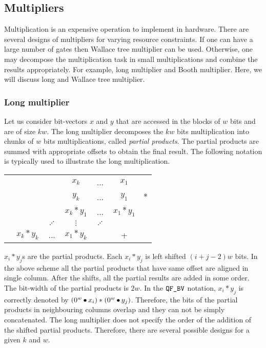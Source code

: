 \subsection{Multipliers}

Multiplication is an expensive operation to implement in hardware.
%
There are several designs of multipliers for varying
resource constraints.
%
If one can have a large number of gates then Wallace tree
multiplier can be used.
%
Otherwise, one may decompose the multiplication task in
small multiplications and combine the results appropriately.
%
For example, long multiplier and Booth multiplier.
%
Here, we will discuss long and Wallace tree multiplier.

\subsubsection{Long multiplier}\label{sec:long-mult}

Let us consider bit-vectors $x$ and $y$ that are accessed in the blocks of $w$
bits and are of size $kw$.
%
The long multiplier decomposes the $kw$ bits multiplication 
into chunks of $w$ bits multiplications, called {\em partial products}.
%
The partial products are summed with appropriate offsets to obtain
the final result.
%
The following notation is typically used to illustrate
the long multiplication.
%
\begin{center}
\begin{tabular}{c@{\quad}c@{\quad}c@{\quad}c@{\quad}c@{\quad}c@{\quad}c}
  &&& $x_{k}$ & ... & $x_1$&\\ 
  &&& $y_{k}$ & ... & $y_1$&$*$\\ \hline
  &&&$x_k*y_1$& ... & $x_1*y_1$&\\
  &&$\iddots$&$\vdots$& $\iddots$ && \\
  &$x_k*y_k$& ... &$x_1*y_k$&  & +&\\\hline
\end{tabular}  
\end{center}
$x_i * y_j$s are the partial products.
%
Each $x_i*y_j$ is left shifted $(i+j-2)w$ bits. 
%
In the above scheme all the partial products that have same offset are 
aligned in single column.
%
After the shifts, all the partial results are added in some order.
%
The bit-width of the partial products is $2w$.
%
In the $\texttt{QF\_BV}$ notation, $x_i * y_j$ is correctly denoted by
$(0^w \mathop{\bullet} x_i)*(0^w \mathop{\bullet} y_j)$.
%
Therefore, the bits of the partial products in neighbouring columns overlap
and they can not be simply concatenated.
%
The long multiplier does not specify the order of the addition
of the shifted partial products.
%
Therefore, there are several possible designs for a given $k$ and $w$.

